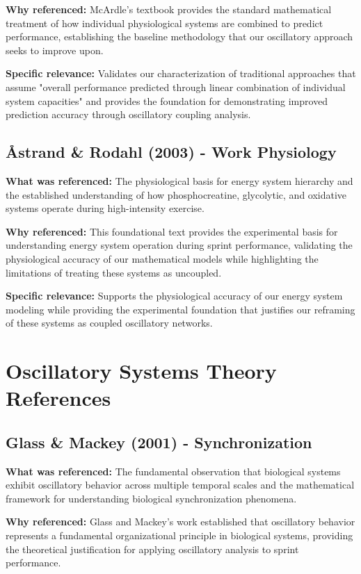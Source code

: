 \documentclass{article}
\begin{document}
\textbf{Why referenced:} McArdle's textbook provides the standard mathematical treatment of how individual physiological systems are combined to predict performance, establishing the baseline methodology that our oscillatory approach seeks to improve upon.

\textbf{Specific relevance:} Validates our characterization of traditional approaches that assume "overall performance predicted through linear combination of individual system capacities" and provides the foundation for demonstrating improved prediction accuracy through oscillatory coupling analysis.

\subsection{Åstrand & Rodahl (2003) - Work Physiology}

\textbf{What was referenced:} The physiological basis for energy system hierarchy and the established understanding of how phosphocreatine, glycolytic, and oxidative systems operate during high-intensity exercise.

\textbf{Why referenced:} This foundational text provides the experimental basis for understanding energy system operation during sprint performance, validating the physiological accuracy of our mathematical models while highlighting the limitations of treating these systems as uncoupled.

\textbf{Specific relevance:} Supports the physiological accuracy of our energy system modeling while providing the experimental foundation that justifies our reframing of these systems as coupled oscillatory networks.

\section{Oscillatory Systems Theory References}

\subsection{Glass \& Mackey (2001) - Synchronization}

\textbf{What was referenced:} The fundamental observation that biological systems exhibit oscillatory behavior across multiple temporal scales and the mathematical framework for understanding biological synchronization phenomena.

\textbf{Why referenced:} Glass and Mackey's work established that oscillatory behavior represents a fundamental organizational principle in biological systems, providing the theoretical justification for applying oscillatory analysis to sprint performance.
\end{document}
